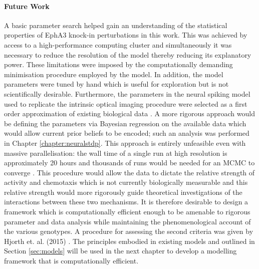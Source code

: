\paragraph{Future Work}
A basic parameter search helped gain an understanding of the statistical properties of EphA3 knock-in perturbations in this work. This was achieved by access to a high-performance computing cluster and simultaneously it was necessary to reduce the resolution of the model thereby reducing its explanatory power. These limitations were imposed by the computationally demanding minimisation procedure employed by the model. In addition, the model parameters were tuned by hand which is useful for exploration but is not scientifically desirable. Furthermore, the parameters in the neural spiking model used to replicate the intrinsic optical imaging procedure were selected as a first order approximation of existing biological data \cite{Phongphanphanee2014-in}. A more rigorous approach would be defining the parameters via Bayesian regression on the available data which would allow current prior beliefs to be encoded; such an analysis was performed in Chapter \ref{chapter:neuralstdp}. This approach is entirely unfeasible even with massive parallelisation: the wall time of a single run at high resolution is approximately 20 hours and thousands of runs would be needed for an MCMC to converge \cite{Gelman1995-uj}. This procedure would allow the data to dictate the relative strength of activity and chemotaxis which is not currently biologically measurable and this relative strength would more rigorously guide theoretical investigations of the interactions between these two mechanisms. It is therefore desirable to design a framework which is computationally efficient enough to be amenable to rigorous parameter and data analysis while maintaining the phenomenological account of the various genotypes. A procedure for assessing the second criteria was given by Hjorth et. al. (2015) \cite{Hjorth2015-le}. The principles embodied in existing models and outlined in Section \ref{sec:models} will be used in the next chapter to develop a modelling framework that is computationally efficient.
